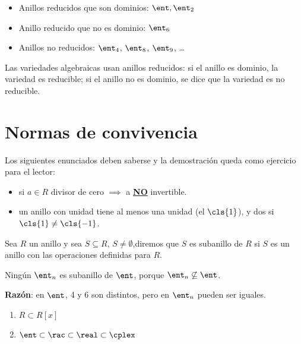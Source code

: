 \begin{example}
	\begin{itemize}
		\item Anillos reducidos que son dominios: $\ent, \ent_2$
		\item Anillo reducido que no es dominio: $\ent_6$
		\item Anillos no reducidos: $\ent_4$, $\ent_8$, $\ent_9$, \dots
	\end{itemize}
\end{example}

\obs Las variedades algebraicas usan anillos reducidos: si el anillo es dominio, la variedad es reducible; si el anillo no es dominio, se dice que la variedad es no reducible.

\section{Normas de convivencia}
Los siguientes enunciados deben saberse y la demostración queda como ejercicio para el lector: %

\begin{itemize}
	\item si $a \in R$ divisor de cero $\implies$ a \underline{\bf NO} invertible.
	\item un anillo con unidad tiene al menos una unidad (el $\cls{1}$), y dos si $\cls{1} \neq \cls{-1}$. %
\end{itemize}

\begin{defn}[Subanillo]
Sea $R$ un anillo y sea $S \subseteq R$, $S \neq \emptyset$,diremos que $S$ es subanillo de $R$ si $S$ es un anillo con las operaciones definidas para $R$.
\end{defn}

\begin{prop}
Ningún $\ent_n$ es subanillo de $\ent$, porque $\ent_n \not \subseteq \ent$.

{\bf Razón}: en $\ent$, 4 y 6 son distintos, pero en $\ent_n$ pueden ser iguales.
\end{prop}

\begin{example}
	\begin{enumerate}
		\item $R \subset R[x]$
		\item $\ent \subset \rac \subset \real \subset \cplex$
	\end{enumerate}
\end{example}

